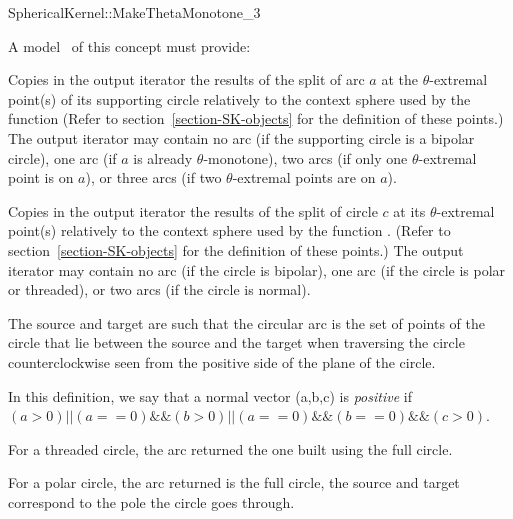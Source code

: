 \begin{ccRefFunctionObjectConcept}{SphericalKernel::MakeThetaMonotone_3}


A model \ccVar\ of this concept must provide:


{
Copies in the output iterator the results of the split of arc $a$ at the $\theta$-extremal
point(s) of its supporting circle relatively to the context sphere used by the function 
(Refer to section~\ref{section-SK-objects} for the definition of these points.)
The output iterator may contain no arc (if the supporting circle is a bipolar circle),
one arc (if $a$ is already $\theta$-monotone), two arcs (if only one $\theta$-extremal point is on $a$), or
three arcs (if two $\theta$-extremal points are on $a$).
}


{Copies in the output iterator the results of the split of circle $c$ at its $\theta$-extremal
point(s) relatively to the context sphere used by the function .
(Refer to section~\ref{section-SK-objects} for the definition of these points.)
The output iterator may contain no arc (if the circle is bipolar),
one arc (if the circle is polar or threaded), or two arcs (if the circle is normal).

The source and target are such that
the circular arc is the set of points of the circle that lie between the source 
and the target when traversing the circle counterclockwise
seen from the positive side of the plane of the circle.

In this definition, we say that a normal vector (a,b,c) is \textit{positive} if 
$(a>0) || (a==0) \&\& (b>0) || (a==0)\&\&(b==0)\&\&(c>0)$.


For a threaded circle, the arc returned the one built using the full circle.

For a polar circle, the arc returned is the full circle, the source and target correspond to the pole the circle goes through.
}

\ccSeeAlso


\end{ccRefFunctionObjectConcept}





